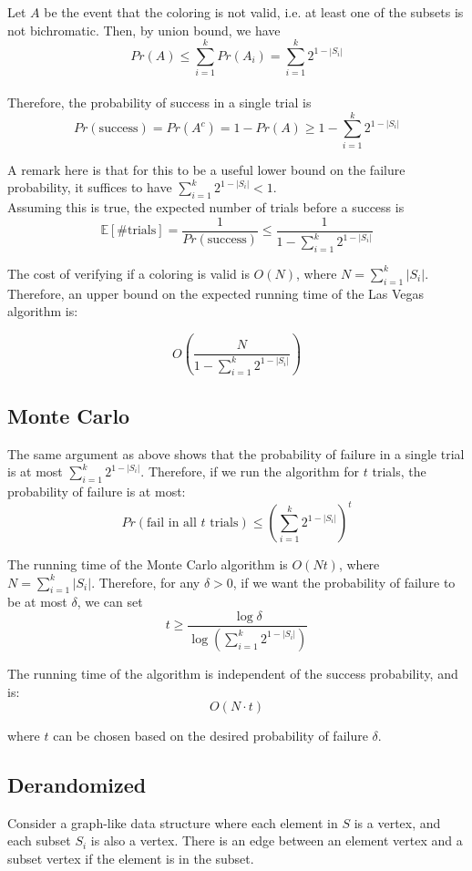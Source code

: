 \documentclass[a4paper]{article}
\begin{document}
\noindent Let $A$ be the event that the coloring is not valid, i.e. at least one of the subsets is not bichromatic. Then, by union bound, we have
\[Pr(A) \leq \sum_{i=1}^{k} Pr(A_i) = \sum_{i=1}^{k} 2^{1-|S_i|}\] \\

\noindent Therefore, the probability of success in a single trial is
\[Pr(\text{success}) = Pr(A^c) = 1 - Pr(A) \geq 1 - \sum_{i=1}^{k} 2^{1-|S_i|}\]

\noindent A remark here is that for this to be a useful lower bound on the failure probability, it suffices to have $\sum_{i=1}^{k} 2^{1-|S_i|} < 1$. \\

\noindent Assuming this is true, the expected number of trials before a success is
\[\mathbb{E}[\text{\# trials}] = \frac{1}{Pr(\text{success})} \leq \frac{1}{1 - \sum_{i=1}^{k} 2^{1-|S_i|}}\]

\noindent The cost of verifying if a coloring is valid is $O(N)$, where $N = \sum_{i=1}^{k} |S_i|$. Therefore, an upper bound on the expected running time of the Las Vegas algorithm is:

\[O\left(\frac{N}{1 - \sum_{i=1}^{k} 2^{1-|S_i|}}\right)\]


\vspace{0.2in}
\subsection*{Monte Carlo}
\noindent The same argument as above shows that the probability of failure in a single trial is at most $\sum_{i=1}^{k} 2^{1-|S_i|}$. Therefore, if we run the algorithm for $t$ trials, the probability of failure is at most:
\[Pr(\text{fail in all } t \text{ trials}) \leq \left(\sum_{i=1}^{k} 2^{1-|S_i|}\right)^t\]

\noindent The running time of the Monte Carlo algorithm is $O(Nt)$, where $N = \sum_{i=1}^{k} |S_i|$. Therefore, for any $\delta > 0$, if we want the probability of failure to be at most $\delta$, we can set
\[t \geq \frac{\log \delta}{\log \left(\sum_{i=1}^{k} 2^{1-|S_i|}\right)}\]

\noindent The running time of the algorithm is independent of the success probability, and is:
\[O\left(N \cdot t\right)\]

\noindent where $t$ can be chosen based on the desired probability of failure $\delta$.

\vspace{0.2in}
\subsection*{Derandomized}
Consider a graph-like data structure where each element in $S$ is a vertex, and each subset $S_i$ is also a vertex. There is an edge between an element vertex and a subset vertex if the element is in the subset. \\
\end{document}
